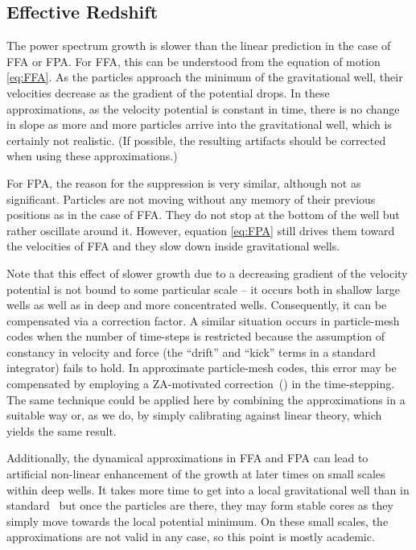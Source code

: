 \subsection{Effective Redshift}
\label{sec:z_eff}
The power spectrum growth is slower than the linear prediction in the case of FFA or FPA. For FFA, this can be understood from the equation of motion \eqref{eq:FFA}. As the particles approach the minimum of the gravitational well, their velocities decrease as the gradient of the potential drops. In these approximations, as the velocity potential is constant in time, there is no change in slope as more and more particles arrive into the gravitational well, which is certainly not realistic. (If possible, the resulting artifacts should be corrected when using these approximations.)

For FPA, the reason for the suppression is very similar, although not as significant. Particles are not moving without any memory of their previous positions as in the case of FFA. They do not stop at the bottom of the well but rather oscillate around it. However, equation \eqref{eq:FPA} still drives them toward the velocities of FFA and they slow down inside gravitational wells.

Note that this effect of slower growth due to a decreasing gradient of the velocity potential is not bound to some particular scale -- it occurs both in shallow large wells as well as in deep and more concentrated wells. Consequently, it can be compensated via a correction factor. A similar situation occurs in particle-mesh codes when the number of time-steps is restricted because the assumption of constancy in velocity and force (the ``drift'' and ``kick'' terms in a standard integrator) fails to hold. In approximate particle-mesh codes, this error may be compensated by employing a ZA-motivated correction~(\cite{Ref:Feng}) in the time-stepping. The same technique could be applied here by combining the approximations in a suitable way or, as we do, by simply calibrating against linear theory, which yields the same result.

Additionally, the dynamical approximations in FFA and FPA can lead to artificial non-linear enhancement of the growth at later times on small scales within deep wells. It takes more time to get into a local gravitational well than in standard \nbody\ but once the particles are there, they may form stable cores as they simply move towards the local potential minimum. On these small scales, the approximations are not valid in any case, so this point is mostly academic.

